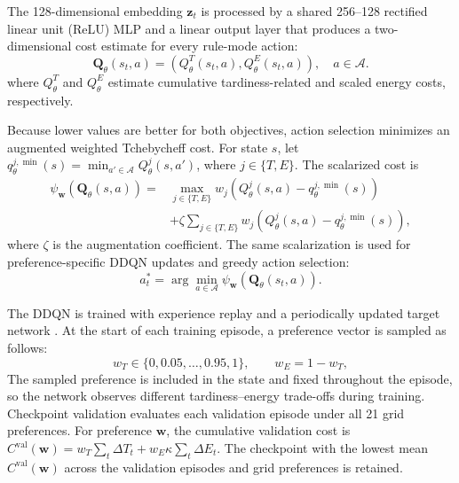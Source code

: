 \documentclass[10pt,journal]{IEEEtran}
\begin{document}
The 128-dimensional embedding $\mathbf{z}_t$ is processed by a shared 256--128 rectified linear unit (ReLU) MLP and a linear output layer that produces a two-dimensional cost estimate for every rule-mode action:
\begin{equation}
    \mathbf{Q}_{\theta}(s_t,a) =
    \left(Q_{\theta}^{T}(s_t,a), Q_{\theta}^{E}(s_t,a)\right),
    \quad a\in\mathcal{A}.
    \label{Eq: vector Q}
\end{equation}
where $Q_{\theta}^{T}$ and $Q_{\theta}^{E}$ estimate cumulative tardiness-related and scaled energy costs, respectively.

Because lower values are better for both objectives, action selection minimizes an augmented weighted Tchebycheff cost. For state $s$, let $q_{\theta}^{j,\min}(s)=\min_{a'\in\mathcal{A}}Q_{\theta}^{j}(s,a')$, where $j\in\{T,E\}$. The scalarized cost is
\begin{equation}
\begin{aligned}
    \psi_{\mathbf{w}}\!\left(\mathbf{Q}_{\theta}(s,a)\right)
    ={}&\max_{j\in\{T,E\}}
    w_j\!\left(Q_{\theta}^{j}(s,a)-q_{\theta}^{j,\min}(s)\right)\\
    &+\zeta\sum_{j\in\{T,E\}}
    w_j\!\left(Q_{\theta}^{j}(s,a)-q_{\theta}^{j,\min}(s)\right),
\end{aligned}
    \label{Eq: tchebycheff scalarization}
\end{equation}
where $\zeta$ is the augmentation coefficient. The same scalarization is used for preference-specific DDQN updates and greedy action selection:
\begin{equation}
    a_t^{*} = \arg\min_{a\in\mathcal{A}}
    \psi_{\mathbf{w}}\left(\mathbf{Q}_{\theta}(s_t,a)\right).
    \label{Eq: greedy action}
\end{equation}


The DDQN is trained with experience replay and a periodically updated target network \cite{vanhasselt2016}. At the start of each training episode, a preference vector is sampled as follows:
\begin{equation}
    w_T\in\{0,0.05,\ldots,0.95,1\},
    \qquad w_E=1-w_T,
    \label{Eq: evaluation preference grid}
\end{equation}
The sampled preference is included in the state and fixed throughout the episode, so the network observes different tardiness--energy trade-offs during training. Checkpoint validation evaluates each validation episode under all 21 grid preferences. For preference $\mathbf{w}$, the cumulative validation cost is
$C^{\mathrm{val}}(\mathbf{w})=
w_T\sum_t\Delta T_t+w_E\kappa\sum_t\Delta E_t$.
The checkpoint with the lowest mean $C^{\mathrm{val}}(\mathbf{w})$ across the validation episodes and grid preferences is retained.
\end{document}
